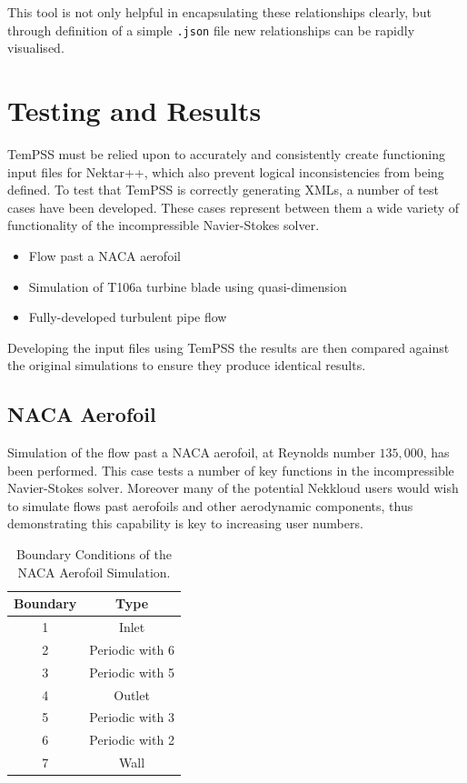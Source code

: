 \documentclass[11pt, a4paper]{report}
\begin{document}
This tool is not only helpful in encapsulating these relationships clearly, but through definition of a simple \texttt{.json} file new relationships can be rapidly visualised.
\newpage
\chapter{Testing and Results}
TemPSS must be relied upon to accurately and consistently create functioning input files for Nektar++, which also prevent logical inconsistencies from being defined. To test that TemPSS is correctly generating XMLs, a number of test cases have been developed. These cases represent between them a wide variety of functionality of the incompressible Navier-Stokes solver.

\begin{itemize}
\item Flow past a NACA aerofoil
\item Simulation of T106a turbine blade using quasi-dimension
\item Fully-developed turbulent pipe flow
\end{itemize}

Developing the input files using TemPSS the results are then compared against the original simulations to ensure they produce identical results.

\section{NACA Aerofoil}
Simulation of the flow past a NACA aerofoil, at Reynolds number $135,000$, has been performed. This case tests a number of key functions in the incompressible Navier-Stokes solver. Moreover many of the potential Nekkloud users would wish to simulate flows past aerofoils and other aerodynamic components, thus demonstrating this capability is key to increasing user numbers.

\begin{table}[htb!]
	\centering
    \begin{tabular}{ c || c }
    \hline
    Boundary & Type \\
    \hline
    1 & Inlet \\
    2 & Periodic with 6\\
    3 & Periodic with 5\\
    4 & Outlet\\
    5 & Periodic with 3\\
    6 & Periodic with 2\\
    7 & Wall\\
    \hline
    \end{tabular}
    \caption{Boundary Conditions of the NACA Aerofoil Simulation.}
    \label{tab:naca_boundaries}
\end{table}
\end{document}
